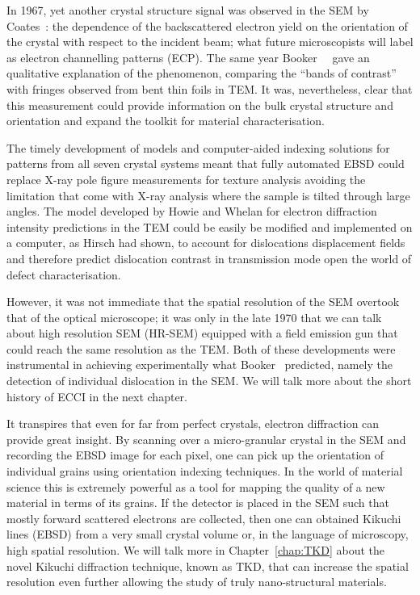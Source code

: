In 1967, yet another crystal structure signal was observed in the SEM by Coates~\cite{Coates67}: the dependence of the backscattered electron yield on the orientation of the crystal with respect to the incident beam; what future microscopists will label as electron channelling patterns (ECP). The same year Booker~\etal~\cite{Booker67} gave an qualitative explanation of the phenomenon, comparing the ``bands of contrast'' with fringes observed from bent thin foils in TEM. It was, nevertheless, clear that this measurement could provide information on the bulk crystal structure and orientation and expand the toolkit for material characterisation. 




The timely development of models and computer-aided indexing solutions for patterns from all seven crystal systems meant that fully automated EBSD could replace X-ray pole figure measurements for texture analysis avoiding the limitation that come with X-ray analysis where the sample is tilted through large angles. The model developed by Howie and Whelan for electron diffraction intensity predictions in the TEM could be easily be modified and implemented on a computer, as Hirsch had shown, to account for dislocations displacement fields and therefore predict dislocation contrast in transmission mode open the world of defect characterisation. 


However, it was not immediate that the spatial resolution of the SEM overtook that of the optical microscope; it was only in the late 1970 that we can talk about high resolution SEM (HR-SEM) equipped with a field emission gun that could reach the same resolution as the TEM. Both of these developments were instrumental in achieving experimentally what Booker~\cite{Booker67} predicted, namely the detection of individual dislocation in the SEM. We will talk more about the short history of ECCI in the next chapter.

It transpires that even for far from perfect crystals, electron diffraction can provide great insight. By scanning over a micro-granular crystal in the SEM and recording the EBSD image for each pixel, one can pick up the orientation of individual grains using orientation indexing techniques. In the world of material science this is extremely powerful as a tool for mapping the quality of a new material in terms of its grains.  If the detector is placed in the SEM such that mostly forward scattered electrons are collected, then one can obtained Kikuchi lines (EBSD) from a very small crystal volume or, in the language of microscopy, high spatial resolution. We will talk more in Chapter~\ref{chap:TKD} about the novel Kikuchi diffraction technique, known as TKD, that can increase the spatial resolution even further allowing the study of truly nano-structural materials.

